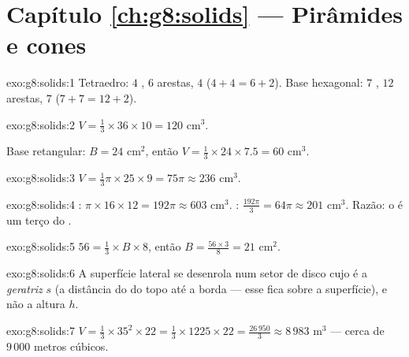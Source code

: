 \section*{Capítulo \ref{ch:g8:solids} --- Pirâmides e cones}

\begin{solution}{exo:g8:solids:1}
Tetraedro: $4$ , $6$ arestas, $4$  ($4 + 4 = 6 + 2$).
Base hexagonal: $7$ , $12$ arestas, $7$ 
($7 + 7 = 12 + 2$).
\end{solution}

\begin{solution}{exo:g8:solids:2}
$V = \frac13 \times 36 \times 10 = 120$ cm$^3$.

Base retangular: $B = 24$ cm$^2$, então
$V = \frac13 \times 24 \times 7.5 = 60$ cm$^3$.
\end{solution}

\begin{solution}{exo:g8:solids:3}
$V = \frac13 \pi \times 25 \times 9 = 75\pi \approx 236$ cm$^3$.
\end{solution}

\begin{solution}{exo:g8:solids:4}
: $\pi \times 16 \times 12 = 192\pi \approx 603$ cm$^3$. :
$\frac{192\pi}{3} = 64\pi \approx 201$ cm$^3$. Razão: o  é um
terço do .
\end{solution}

\begin{solution}{exo:g8:solids:5}
$56 = \frac13 \times B \times 8$, então
$B = \frac{56 \times 3}{8} = 21$ cm$^2$.
\end{solution}

\begin{solution}{exo:g8:solids:6}
A superfície lateral se desenrola num setor de disco cujo  é a
\emph{geratriz} $s$ (a distância do  do topo até a borda ---
esse  fica sobre a superfície), e não a altura $h$.
\end{solution}

\begin{solution}{exo:g8:solids:7}
$V = \frac13 \times 35^2 \times 22 = \frac13 \times 1225 \times 22
= \frac{26\,950}{3} \approx 8\,983$ m$^3$ --- cerca de $9\,000$ metros
cúbicos.
\end{solution}

